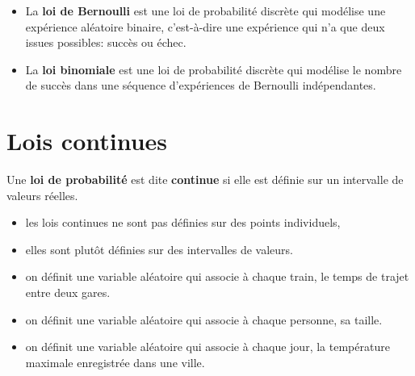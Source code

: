 \begin{exemple}[\quad]{}
	\begin{itemize}
		\item La \textbf{loi de Bernoulli} est une loi de probabilité discrète qui modélise une expérience aléatoire binaire, c'est-à-dire une expérience qui n'a que deux issues possibles: succès ou échec.
		\item La \textbf{loi binomiale} est une loi de probabilité discrète qui modélise le nombre de succès dans une séquence d'expériences de Bernoulli indépendantes.
	\end{itemize}
\end{exemple}


\section{Lois continues}

\begin{definition}{}
Une \textbf{loi de probabilité} est dite \textbf{continue} si elle est définie sur un intervalle de valeurs réelles. 

\begin{itemize}
	\item les lois continues ne sont pas définies sur des points individuels,
	\item elles sont plutôt définies sur des intervalles de valeurs.
\end{itemize}
\end{definition}

\begin{exemple}{}
	\begin{itemize}
		\item on définit une variable aléatoire qui associe à chaque train, le temps de trajet entre deux gares.
		\item on définit une variable aléatoire qui associe à chaque personne, sa taille.
		\item on définit une variable aléatoire qui associe à chaque jour, la température maximale enregistrée dans une ville.
	\end{itemize}
\end{exemple}

